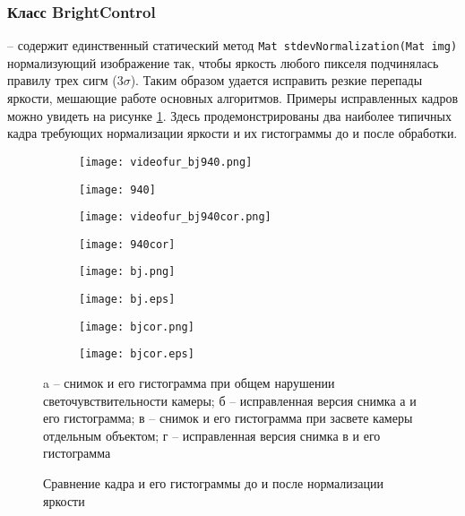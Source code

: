 \subsubsection{Класс BrightControl~}
-- содержит единственный статический метод \texttt{Mat stdevNormalization(Mat img)} нормализующий изображение так, чтобы яркость любого пикселя подчинялась правилу трех сигм ($3\sigma$). Таким образом удается исправить резкие перепады яркости, мешающие работе основных алгоритмов. 
Примеры исправленных кадров можно увидеть на рисунке \ref{fig:bc}. Здесь продемонстрированы два наиболее типичных кадра требующих нормализации яркости и их гистограммы до и после обработки.
\begin{figure}
    \centering
    \begin{subfigure}{\textwidth}  
        \centering
        \texttt{[image: videofur\_bj940.png]}
    \end{subfigure}
    \begin{subfigure}{\textwidth}  
        \centering
        \texttt{[image: 940]}
        \caption{}
    \end{subfigure}
    \begin{subfigure}{\textwidth}  
        \centering
        \texttt{[image: videofur\_bj940cor.png]}
    \end{subfigure}
    \begin{subfigure}{\textwidth}  
        \centering
        \texttt{[image: 940cor]}
        \caption{}
    \end{subfigure}
    \begin{subfigure}{\textwidth}  
        \centering
        \texttt{[image: bj.png]}
    \end{subfigure}
    \begin{subfigure}{\textwidth}  
        \centering
        \texttt{[image: bj.eps]}
        \caption{}
    \end{subfigure}
    \begin{subfigure}{\textwidth}  
        \centering
        \texttt{[image: bjcor.png]}
    \end{subfigure}
    \begin{subfigure}{\textwidth}  
        \centering
        \texttt{[image: bjcor.eps]}
        \caption{}
    \end{subfigure}
    \label{fig:bc}
\begin{center}
    a -- снимок и его гистограмма при общем нарушении светочувствительности камеры; б -- исправленная версия снимка а  и его гистограмма; в -- снимок и его гистограмма при засвете камеры отдельным объектом; г -- исправленная версия снимка в и его гистограмма
\end{center}
    \caption{Сравнение кадра и его гистограммы до и после нормализации яркости}
\end{figure}
